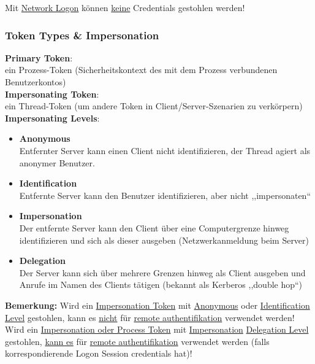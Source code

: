 Mit \underline{Network Logon} können \underline{keine} Credentials gestohlen werden!

\subsubsection{Token Types \& Impersonation}

\textbf{Primary Token}:\\
ein Prozess-Token (Sicherheitskontext des mit dem Prozess verbundenen Benutzerkontos)\\

\textbf{Impersonating Token}:\\
ein Thread-Token (um andere Token in Client/Server-Szenarien zu verkörpern)\\

\textbf{Impersonating Levels}:
\begin{itemize}
    \item \textbf{Anonymous}\\
    Entfernter Server kann einen Client nicht identifizieren, der Thread agiert als anonymer Benutzer.
    \item \textbf{Identification}\\
    Entfernte Server kann den Benutzer identifizieren, aber nicht ,,impersonaten``
    \item \textbf{Impersonation}\\
    Der entfernte Server kann den Client über eine Computergrenze hinweg identifizieren und sich als dieser ausgeben (Netzwerkanmeldung beim Server)
    \item \textbf{Delegation}\\
    Der Server kann sich über mehrere Grenzen hinweg als Client ausgeben und Anrufe im Namen des Clients tätigen (bekannt als Kerberos ,,double hop``)\\
\end{itemize}

\textbf{Bemerkung:}
Wird ein \underline{Impersonation Token} mit \underline{Anonymous} oder \underline{Identification Level} gestohlen, kann es \underline{nicht} für \underline{remote authentifikation} verwendet werden! \\
Wird ein \underline{Impersonation oder Process Token} mit \underline{Impersonation} \underline{Delegation Level} gestohlen, \underline{kann es} für \underline{remote authentifikation} verwendet werden (falls korrespondierende Logon Session credentials hat)!

\newpage

